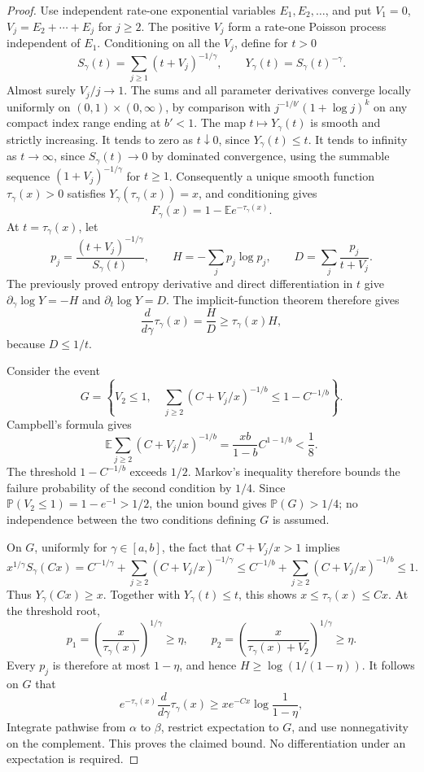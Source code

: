 \documentclass[11pt,a4paper]{article}
\begin{document}
\begin{proof}
Use independent rate-one exponential variables $E_1,E_2,\ldots$, and
put $V_1=0$, $V_j=E_2+\cdots+E_j$ for $j\geq2$.
The positive $V_j$ form a rate-one Poisson process independent of $E_1$.
Conditioning on all the $V_j$, define for $t>0$
\[
 S_\gamma(t)=\sum_{j\geq1}(t+V_j)^{-1/\gamma},
 \qquad Y_\gamma(t)=S_\gamma(t)^{-\gamma}.
\]
Almost surely $V_j/j\to1$. The sums and all parameter derivatives
converge locally uniformly on $(0,1)\times(0,\infty)$, by comparison
with $j^{-1/b'}(1+\log j)^k$ on any compact index range ending at
$b'<1$. The map $t\mapsto Y_\gamma(t)$ is smooth and strictly
increasing. It tends to zero as $t\downarrow0$, since
$Y_\gamma(t)\leq t$. It tends to infinity as $t\to\infty$, since
$S_\gamma(t)\to0$ by dominated convergence, using the summable
sequence $(1+V_j)^{-1/\gamma}$ for $t\geq1$.
Consequently a unique smooth function $\tau_\gamma(x)>0$ satisfies
$Y_\gamma(\tau_\gamma(x))=x$, and conditioning gives
\[
 F_\gamma(x)=1-\mathbb E e^{-\tau_\gamma(x)}.
\]
At $t=\tau_\gamma(x)$, let
\[
 p_j=\frac{(t+V_j)^{-1/\gamma}}{S_\gamma(t)},
 \qquad H=-\sum_jp_j\log p_j,
 \qquad D=\sum_j\frac{p_j}{t+V_j}.
\]
The previously proved entropy derivative and direct differentiation in
$t$ give $\partial_\gamma\log Y=-H$ and $\partial_t\log Y=D$.
The implicit-function theorem therefore gives
\[
 \frac{d}{d\gamma}\tau_\gamma(x)=\frac H D
       \geq\tau_\gamma(x)H,
\]
because $D\leq1/t$.

Consider the event
\[
 G=\left\{V_2\leq1,\quad
 \sum_{j\geq2}(C+V_j/x)^{-1/b}\leq1-C^{-1/b}\right\}.
\]
Campbell's formula gives
\[
 \mathbb E\sum_{j\geq2}(C+V_j/x)^{-1/b}
 =\frac{xb}{1-b}C^{1-1/b}<\frac18.
\]
The threshold $1-C^{-1/b}$ exceeds $1/2$. Markov's inequality
therefore bounds the failure probability of the second condition by
$1/4$. Since $\mathbb P(V_2\leq1)=1-e^{-1}>1/2$,
the union bound gives $\mathbb P(G)>1/4$; no independence between the
two conditions defining $G$ is assumed.

On $G$, uniformly for $\gamma\in[a,b]$, the fact that
$C+V_j/x>1$ implies
\[
 x^{1/\gamma}S_\gamma(Cx)
 =C^{-1/\gamma}+\sum_{j\geq2}(C+V_j/x)^{-1/\gamma}
 \leq C^{-1/b}+\sum_{j\geq2}(C+V_j/x)^{-1/b}\leq1.
\]
Thus $Y_\gamma(Cx)\geq x$. Together with $Y_\gamma(t)\leq t$,
this shows $x\leq\tau_\gamma(x)\leq Cx$. At the threshold root,
\[
 p_1=\left(\frac{x}{\tau_\gamma(x)}\right)^{1/\gamma}\geq\eta,
 \qquad
 p_2=\left(\frac{x}{\tau_\gamma(x)+V_2}\right)^{1/\gamma}\geq\eta.
\]
Every $p_j$ is therefore at most $1-\eta$, and hence
$H\geq\log(1/(1-\eta))$. It follows on $G$ that
\[
 e^{-\tau_\gamma(x)}\frac{d}{d\gamma}\tau_\gamma(x)
 \geq x e^{-Cx}\log\frac1{1-\eta},
\]
Integrate pathwise from $\alpha$ to $\beta$, restrict expectation to
$G$, and use nonnegativity on the complement. This proves the claimed
bound. No differentiation under an expectation is required.
\end{proof}
\end{document}
